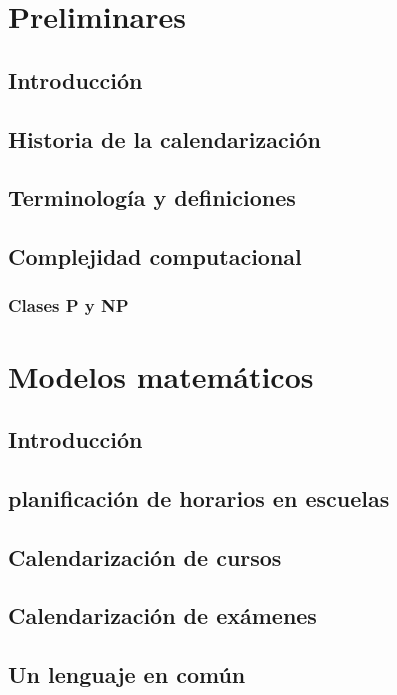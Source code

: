 \documentclass[draft,12pt,headsepline,footsepline,paper=letter]{scrreprt}
\begin{document}
\chapter{Preliminares}

\section{Introducción}

\section{Historia de la calendarización}

\section{Terminología y definiciones}

\section{Complejidad computacional}

\subsection{Clases P y NP}

\chapter{Modelos matemáticos}

\section{Introducción}

\section{planificación de horarios en escuelas}

\section{Calendarización de cursos}

\section{Calendarización de exámenes}

\section{Un lenguaje en común}
\end{document}
